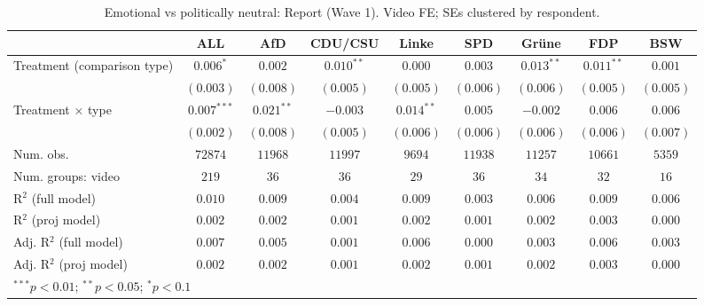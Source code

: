 
\begin{table}
\begin{center}
\begin{tabular}{l c c c c c c c c}
\hline
 & ALL & AfD & CDU/CSU & Linke & SPD & Grüne & FDP & BSW \\
\hline
Treatment (comparison type) & $0.006^{*}$   & $0.002$      & $0.010^{**}$ & $0.000$      & $0.003$   & $0.013^{**}$ & $0.011^{**}$ & $0.001$   \\
                            & $(0.003)$     & $(0.008)$    & $(0.005)$    & $(0.005)$    & $(0.006)$ & $(0.006)$    & $(0.005)$    & $(0.005)$ \\
Treatment × type            & $0.007^{***}$ & $0.021^{**}$ & $-0.003$     & $0.014^{**}$ & $0.005$   & $-0.002$     & $0.006$      & $0.006$   \\
                            & $(0.002)$     & $(0.008)$    & $(0.005)$    & $(0.006)$    & $(0.006)$ & $(0.006)$    & $(0.006)$    & $(0.007)$ \\
\hline
Num. obs.                   & $72874$       & $11968$      & $11997$      & $9694$       & $11938$   & $11257$      & $10661$      & $5359$    \\
Num. groups: video          & $219$         & $36$         & $36$         & $29$         & $36$      & $34$         & $32$         & $16$      \\
R$^2$ (full model)          & $0.010$       & $0.009$      & $0.004$      & $0.009$      & $0.003$   & $0.006$      & $0.009$      & $0.006$   \\
R$^2$ (proj model)          & $0.002$       & $0.002$      & $0.001$      & $0.002$      & $0.001$   & $0.002$      & $0.003$      & $0.000$   \\
Adj. R$^2$ (full model)     & $0.007$       & $0.005$      & $0.001$      & $0.006$      & $0.000$   & $0.003$      & $0.006$      & $0.003$   \\
Adj. R$^2$ (proj model)     & $0.002$       & $0.002$      & $0.001$      & $0.002$      & $0.001$   & $0.002$      & $0.003$      & $0.000$   \\
\hline
\multicolumn{9}{l}{\scriptsize{$^{***}p<0.01$; $^{**}p<0.05$; $^{*}p<0.1$}}
\end{tabular}
\caption{Emotional vs politically neutral: Report (Wave 1). Video FE; SEs clustered by respondent.}
\label{tab:compare_emotional_vs_neutral_report}
\end{center}
\end{table}

